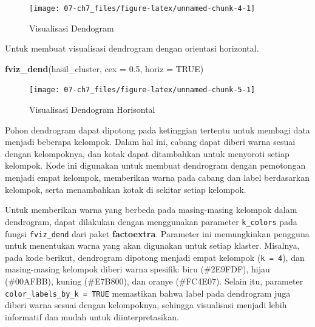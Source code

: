\documentclass[
  oneside]{book}
\newenvironment{Shaded}{\begin{snugshade}}{\end{snugshade}}
\newcommand{\AttributeTok}[1]{\textcolor[rgb]{0.13,0.29,0.53}{#1}}
\newcommand{\ConstantTok}[1]{\textcolor[rgb]{0.56,0.35,0.01}{#1}}
\newcommand{\FloatTok}[1]{\textcolor[rgb]{0.00,0.00,0.81}{#1}}
\newcommand{\FunctionTok}[1]{\textcolor[rgb]{0.13,0.29,0.53}{\textbf{#1}}}
\newcommand{\NormalTok}[1]{#1}
\begin{document}
\begin{figure}[h]

{\centering \texttt{[image: 07-ch7\_files/figure-latex/unnamed-chunk-4-1]} 

}

\caption{Visualisasi Dendogram}\label{fig:unnamed-chunk-4}
\end{figure}

Untuk membuat visualisasi dendrogram dengan orientasi horizontal.

\begin{Shaded}
\begin{Highlighting}[]
\FunctionTok{fviz\_dend}\NormalTok{(hasil\_cluster, }\AttributeTok{cex =} \FloatTok{0.5}\NormalTok{, }\AttributeTok{horiz =} \ConstantTok{TRUE}\NormalTok{)}
\end{Highlighting}
\end{Shaded}

\begin{figure}[h]

{\centering \texttt{[image: 07-ch7\_files/figure-latex/unnamed-chunk-5-1]} 

}

\caption{Visualisasi Dendogram Horisontal}\label{fig:unnamed-chunk-5}
\end{figure}

Pohon dendrogram dapat dipotong pada ketinggian tertentu untuk membagi data menjadi beberapa kelompok. Dalam hal ini, cabang dapat diberi warna sesuai dengan kelompoknya, dan kotak dapat ditambahkan untuk menyoroti setiap kelompok. Kode ini digunakan untuk membuat dendrogram dengan pemotongan menjadi empat kelompok, memberikan warna pada cabang dan label berdasarkan kelompok, serta menambahkan kotak di sekitar setiap kelompok.

Untuk memberikan warna yang berbeda pada masing-masing kelompok dalam dendrogram, dapat dilakukan dengan menggunakan parameter \texttt{k\_colors} pada fungsi \texttt{fviz\_dend} dari paket \textbf{factoextra}. Parameter ini memungkinkan pengguna untuk menentukan warna yang akan digunakan untuk setiap klaster. Misalnya, pada kode berikut, dendrogram dipotong menjadi empat kelompok (\texttt{k\ =\ 4}), dan masing-masing kelompok diberi warna spesifik: biru (\#2E9FDF), hijau (\#00AFBB), kuning (\#E7B800), dan oranye (\#FC4E07). Selain itu, parameter \texttt{color\_labels\_by\_k\ =\ TRUE} memastikan bahwa label pada dendrogram juga diberi warna sesuai dengan kelompoknya, sehingga visualisasi menjadi lebih informatif dan mudah untuk diinterpretasikan.
\end{document}
